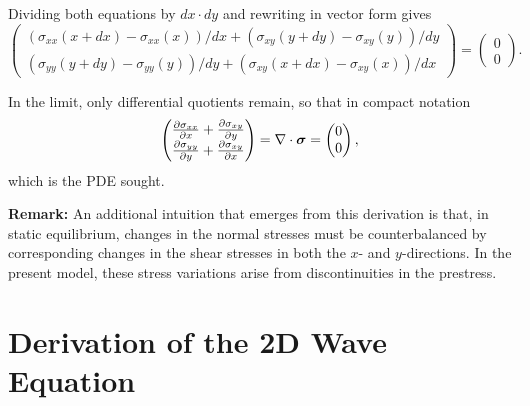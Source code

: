 Dividing both equations by $dx \cdot dy$ and rewriting in vector form gives
\begin{equation}
    \left(
    \begin{matrix}
        (\sigma_{xx}(x+dx) - 
        \sigma_{xx}(x))/dx + 
        (\sigma_{xy}(y+dy) - 
        \sigma_{xy}(y))/dy\\
        
        (\sigma_{yy}(y+dy) -
        \sigma_{yy}(y))/dy +
        (\sigma_{xy}(x+dx) - 
        \sigma_{xy}(x))/dx
    \end{matrix}
    \right) = 
    \left(
    \begin{matrix}
        0\\
        0
    \end{matrix}
    \right).
\end{equation}

In the limit, only differential quotients remain, so that in compact notation
\begin{equation*}
    \left(
    \begin{matrix}
        \frac{\partial\sigma_{xx}}{\partial x} +
        \frac{\partial\sigma_{xy}}{\partial y}\\
        
        \frac{\partial\sigma_{yy}}{\partial y} +
        \frac{\partial\sigma_{xy}}{\partial x}
    \end{matrix}
    \right) = 
    \nabla\cdot \boldsymbol{\sigma} =
    \left(
    \begin{matrix}
        0\\
        0
    \end{matrix}
    \right),
\end{equation*}
which is the PDE sought.  

\textbf{Remark:} An additional intuition that emerges from this derivation is that, in static equilibrium, changes in the normal stresses must be counterbalanced by corresponding changes in the shear stresses in both the $x$- and $y$-directions. In the present model, these stress variations arise from discontinuities in the prestress.















\section{Derivation of the 2D Wave Equation}
\label{sec:derivation_wave}

